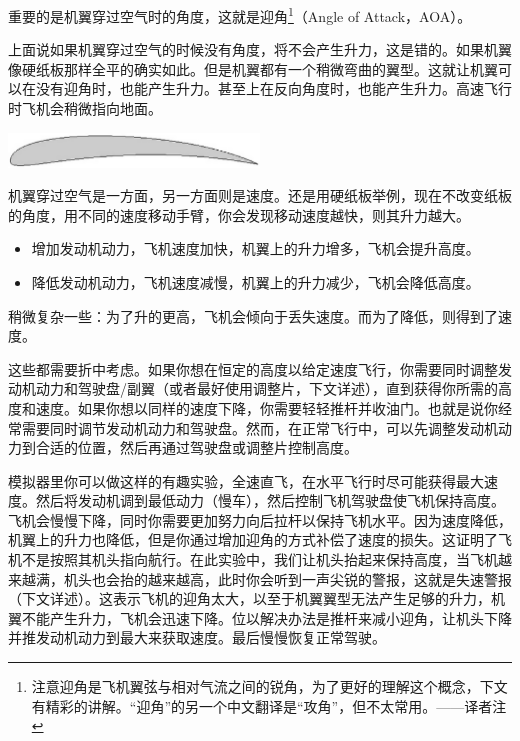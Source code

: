重要的是机翼穿过空气时的角度，这就是迎角\footnote{注意迎角是飞机翼弦与相对气流之间的锐角，为了更好的理解这个概念，下文有精彩的讲解。“迎角”的另一个中文翻译是“攻角”，但不太常用。——译者注}（Angle of Attack，AOA）。

上面说如果机翼穿过空气的时候没有角度，将不会产生升力，这是错的。如果机翼像硬纸板那样全平的确实如此。但是机翼都有一个稍微弯曲的翼型。这就让机翼可以在没有迎角时，也能产生升力。甚至上在反向角度时，也能产生升力。高速飞行时飞机会稍微指向地面。

\begin{center}
\includegraphics[width=0.5\textwidth]{img/tut_32}
\end{center}

机翼穿过空气是一方面，另一方面则是速度。还是用硬纸板举例，现在不改变纸板的角度，用不同的速度移动手臂，你会发现移动速度越快，则其升力越大。

\begin{itemize}
    \item 增加发动机动力，飞机速度加快，机翼上的升力增多，飞机会提升高度。
    \item 降低发动机动力，飞机速度减慢，机翼上的升力减少，飞机会降低高度。
\end{itemize}

稍微复杂一些：为了升的更高，飞机会倾向于丢失速度。而为了降低，则得到了速度。

这些都需要折中考虑。如果你想在恒定的高度以给定速度飞行，你需要同时调整发动机动力和驾驶盘/副翼（或者最好使用调整片，下文详述），直到获得你所需的高度和速度。如果你想以同样的速度下降，你需要轻轻推杆并收油门。也就是说你经常需要同时调节发动机动力和驾驶盘。然而，在正常飞行中，可以先调整发动机动力到合适的位置，然后再通过驾驶盘或调整片控制高度。

模拟器里你可以做这样的有趣实验，全速直飞，在水平飞行时尽可能获得最大速度。然后将发动机调到最低动力（慢车），然后控制飞机驾驶盘使飞机保持高度。飞机会慢慢下降，同时你需要更加努力向后拉杆以保持飞机水平。因为速度降低，机翼上的升力也降低，但是你通过增加迎角的方式补偿了速度的损失。这证明了飞机不是按照其机头指向航行。在此实验中，我们让机头抬起来保持高度，当飞机越来越满，机头也会抬的越来越高，此时你会听到一声尖锐的警报，这就是失速警报（下文详述）。这表示飞机的迎角太大，以至于机翼翼型无法产生足够的升力，机翼不能产生升力，飞机会迅速下降。位以解决办法是推杆来减小迎角，让机头下降并推发动机动力到最大来获取速度。最后慢慢恢复正常驾驶。

